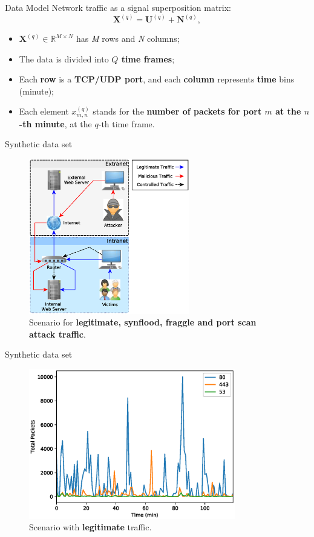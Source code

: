 \documentclass[newPxFont, numfooter, sectionpages]{beamer}
\begin{document}
\begin{frame}{Data Model}
	Network traffic as a signal superposition matrix:
	\begin{equation}\label{eq:eq01}
		\boldsymbol{X}^{(q)} = \boldsymbol{U}^{(q)} + \boldsymbol{N}^{(q)},
	\end{equation}
	\begin{itemize}
	    \item $\boldsymbol{X}^{(q)} \in \mathbb{R}^{M \times N}$ has \emph{M} rows and \emph{N} columns;
		\item The data is divided into \textbf{$Q$ time frames};
		\item Each \textbf{row} is a \textbf{TCP/UDP port}, and each \textbf{column} represents \textbf{time} bins (minute);
		\item Each element $x_{m,n}^{(q)}$ stands for the \textbf{number of packets for port $m$ at the $n$-th minute}, at the $q$-th time frame.
	\end{itemize}
\end{frame}

\begin{frame}[c]{Synthetic data set}
	\begin{figure}[h!]
	     \centering
	     \includegraphics[width=7cm]{figures/ch2/scenario.eps}
	     \caption{Scenario for \textbf{legitimate, synflood, fraggle and port scan attack traffic}.}
	     \label{fig:2_fig1}
	\end{figure}
\end{frame}

\begin{frame}[c]{Synthetic data set}
	\begin{figure}[h!]
	     \centering
	     \includegraphics[width=9cm]{figures/ch2/user_operations.eps}
	     \caption{Scenario with \textbf{legitimate} traffic.}
	     \label{fig:2_fig1}
	\end{figure}
\end{frame}
\end{document}
